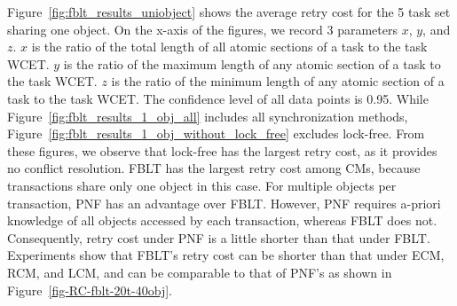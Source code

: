 \documentclass[conference,letterpaper]{IEEEtran}
\begin{document}
Figure~\ref{fig:fblt_results_uniobject} shows the average retry cost for the 5 task set sharing one object. On the x-axis of the figures, we record 3 parameters $x$, $y$, and $z$. $x$ is the ratio of the total length of all atomic sections of a task to the task WCET. $y$ is the ratio of the maximum length of any atomic section of a task to the task WCET. $z$ is the ratio of the minimum length of any atomic section of a task to the task WCET. The confidence level of all data points is 0.95. While Figure~\ref{fig:fblt_results_1_obj_all} includes all synchronization methods, Figure~\ref{fig:fblt_results_1_obj_without_lock_free} excludes lock-free. From these figures, we observe that lock-free has the largest retry cost, as it provides no conflict resolution. FBLT has the largest retry cost among CMs,  because transactions share only one object in this case. For multiple objects per transaction, 
%
PNF has an advantage over FBLT. However, PNF requires a-priori knowledge of all objects accessed by each transaction, whereas FBLT does not. Consequently, retry cost under PNF is a little shorter than that under FBLT. 
Experiments show that FBLT's retry cost can be shorter than that under ECM, RCM, and LCM, and can be comparable to that of PNF's as shown in Figure~\ref{fig-RC-fblt-20t-40obj}. 
%

\end{document}
